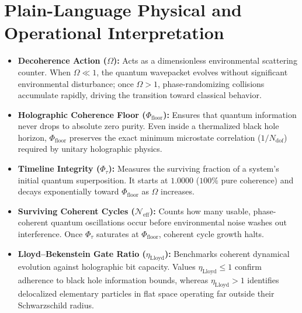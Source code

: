 \documentclass[11pt,a4paper]{article}
\begin{document}
\section{Plain-Language Physical and Operational Interpretation}
\begin{itemize}
\item \textbf{Decoherence Action ($\Omega$):} Acts as a dimensionless environmental scattering counter. When $\Omega \ll 1$, the quantum wavepacket evolves without significant environmental disturbance; once $\Omega > 1$, phase-randomizing collisions accumulate rapidly, driving the transition toward classical behavior.
\item \textbf{Holographic Coherence Floor ($\Phi_{\mathrm{floor}}$):} Ensures that quantum information never drops to absolute zero purity. Even inside a thermalized black hole horizon, $\Phi_{\mathrm{floor}}$ preserves the exact minimum microstate correlation ($1 / N_{\mathrm{dof}}$) required by unitary holographic physics.
\item \textbf{Timeline Integrity ($\Phi_\tau$):} Measures the surviving fraction of a system's initial quantum superposition. It starts at $1.0000$ ($100\%$ pure coherence) and decays exponentially toward $\Phi_{\mathrm{floor}}$ as $\Omega$ increases.
\item \textbf{Surviving Coherent Cycles ($\mathcal{N}_{\mathrm{eff}}$):} Counts how many usable, phase-coherent quantum oscillations occur before environmental noise washes out interference. Once $\Phi_\tau$ saturates at $\Phi_{\mathrm{floor}}$, coherent cycle growth halts.
\item \textbf{Lloyd--Bekenstein Gate Ratio ($\eta_{\mathrm{Lloyd}}$):} Benchmarks coherent dynamical evolution against holographic bit capacity. Values $\eta_{\mathrm{Lloyd}} \le 1$ confirm adherence to black hole information bounds, whereas $\eta_{\mathrm{Lloyd}} > 1$ identifies delocalized elementary particles in flat space operating far outside their Schwarzschild radius.
\end{itemize}
\end{document}
